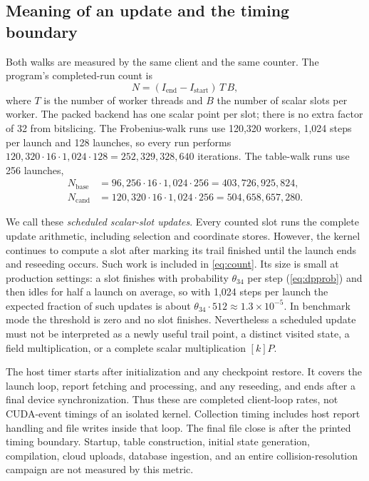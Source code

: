 \documentclass[11pt,a4paper]{article}
\begin{document}
\subsection{Meaning of an update and the timing boundary}
Both walks are measured by the same client and the same counter. The program's completed-run count is
\begin{equation}\label{eq:count}
 N=(I_{\mathrm{end}}-I_{\mathrm{start}})\,T\,B,
\end{equation}
where $T$ is the number of worker threads and $B$ the number of scalar slots per worker. The packed backend has one scalar point per slot; there is no extra factor of 32 from bitslicing. The Frobenius-walk runs use 120,320 workers, 1,024 steps per launch and 128 launches, so every run performs $120{,}320\cdot16\cdot1{,}024\cdot128=252{,}329{,}328{,}640$ iterations. The table-walk runs use 256 launches,
\begin{align}
 N_{\mathrm{base}}&=96{,}256\cdot16\cdot1{,}024\cdot256=403{,}726{,}925{,}824,\\
 N_{\mathrm{cand}}&=120{,}320\cdot16\cdot1{,}024\cdot256=504{,}658{,}657{,}280.
\end{align}

We call these \emph{scheduled scalar-slot updates}. Every counted slot runs the complete update arithmetic, including selection and coordinate stores. However, the kernel continues to compute a slot after marking its trail finished until the launch ends and reseeding occurs. Such work is included in \cref{eq:count}. Its size is small at production settings: a slot finishes with probability $\theta_{34}$ per step (\cref{eq:dpprob}) and then idles for half a launch on average, so with 1,024 steps per launch the expected fraction of such updates is about $\theta_{34}\cdot512\approx1.3\times10^{-5}$. In benchmark mode the threshold is zero and no slot finishes. Nevertheless a scheduled update must not be interpreted as a newly useful trail point, a distinct visited state, a field multiplication, or a complete scalar multiplication $[k]P$.

The host timer starts after initialization and any checkpoint restore. It covers the launch loop, report fetching and processing, and any reseeding, and ends after a final device synchronization. Thus these are completed client-loop rates, not CUDA-event timings of an isolated kernel. Collection timing includes host report handling and file writes inside that loop. The final file close is after the printed timing boundary. Startup, table construction, initial state generation, compilation, cloud uploads, database ingestion, and an entire collision-resolution campaign are not measured by this metric.
\end{document}
